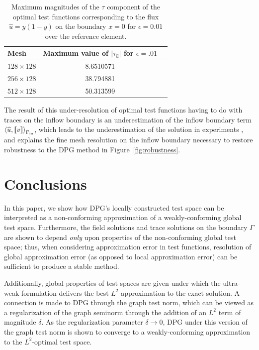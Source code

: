 \documentclass[11pt,onecolumn]{scrartcl}
\newcommand{\LRs}[1]{\left[ #1 \right]}
\newcommand{\LRa}[1]{\left\langle #1 \right\rangle}
\newcommand{\jump}[1] {\ensuremath{\LRs{\!\left[#1\right]\!}}}
\newcommand{\uh}{\widehat{u}}
\begin{document}
\begin{table}
  \label{table:magnitudes}
  \begin{center}
  \begin{tabular}{|| l || c || r   }
    \hline
    Mesh & Maximum value of $| \tau_{\uh} |$ for $\epsilon=.01$ \\ \hline
    $128\times 128$ & 8.6510571  \\ \hline
    $256\times 128$ & 38.794881  \\ \hline
    $512\times 128$ & 50.313599  \\
    \hline
  \end{tabular}
\end{center}
\caption{Maximum magnitudes of the $\tau$ component of the optimal test functions corresponding to the flux $\widehat{u}=y(1-y)$ on the boundary $x = 0$ for $\epsilon = 0.01$ over the reference element.  }
\end{table}

The result of this under-resolution of optimal test functions having to do with traces on the inflow boundary is an underestimation of the inflow boundary term $\LRa{\uh,\jump{v}}_{\Gamma_{\rm in}}$, which leads to the underestimation of the solution in experiments \cite{shishkinDPG}, and explains the fine mesh resolution on the inflow boundary necessary to restore robustness to the DPG method in Figure~\ref{fig:robustness}.  

\section{Conclusions}

In this paper, we show how DPG's locally constructed test space can be interpreted as a non-conforming approximation of a weakly-conforming global test space.  Furthermore, the field solutions and trace solutions on the boundary $\Gamma$ are shown to depend \textit{only} upon properties of the non-conforming global test space; thus, when considering approximation error in test functions, resolution of global approximation error (as opposed to local approximation error) can be sufficient to produce a stable method.

Additionally, global properties of test spaces are given under which the ultra-weak formulation delivers the best $L^2$-approximation to the exact solution.  A connection is made to DPG through the graph test norm, which can be viewed as a regularization of the graph seminorm through the addition of an $L^2$ term of magnitude $\delta$. As the regularization parameter $\delta \rightarrow 0$, DPG under this version of the graph test norm is shown to converge to a weakly-conforming approximation to the $L^2$-optimal test space.  
\end{document}
